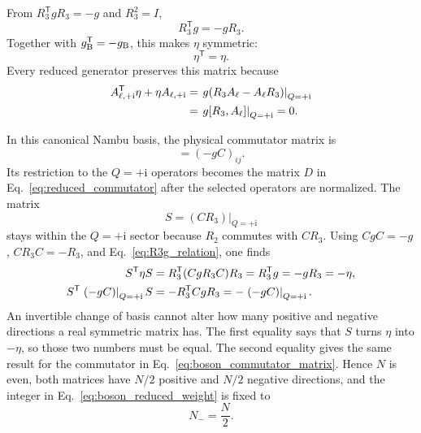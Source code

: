 \documentclass[onecolumn,aps,prb,amsmath,amssymb,superscriptaddress,longbibliography]{revtex4-2}
\newcommand{\ii}{\mathrm{i}}
\newcommand{\trans}{\mathsf{T}}
\begin{document}
From \(R_3^\trans gR_3=-g\) and \(R_3^2=I\),
\begin{equation}
    R_3^\trans g=-gR_3.
    \label{eq:R3g_relation}
\end{equation}
Together with \(g_{\rm B}^\trans=-g_{\rm B}\), this makes \(\eta\) symmetric:
\begin{equation}
    \eta^\trans=\eta.
    \label{eq:eta_symmetric}
\end{equation}
Every reduced generator preserves this matrix because
\begin{align}
    A_{\ell,+\ii}^\trans\eta+\eta A_{\ell,+\ii}
    &=\left.g(R_3A_\ell-A_\ell R_3)\right|_{Q=+\ii}
    \notag\\
    &=\left.g[R_3,A_\ell]\right|_{Q=+\ii}=0.
    \label{eq:eta_generator_relation}
\end{align}

In this canonical Nambu basis, the physical commutator matrix is
\begin{equation}
    [\hat\chi_i,\hat\chi_j^+]=(-gC)_{ij}.
    \label{eq:boson_commutator_matrix}
\end{equation}
Its restriction to the \(Q=+\ii\) operators becomes the matrix \(D\) in Eq.~\eqref{eq:reduced_commutator} after the selected operators are normalized.
The matrix
\begin{equation}
    S=(CR_3)\big|_{Q=+\ii}
    \label{eq:S_definition}
\end{equation}
stays within the \(Q=+\ii\) sector because \(R_2\) commutes with \(CR_3\).  Using \(CgC=-g\), \(CR_3C=-R_3\), and Eq.~\eqref{eq:R3g_relation}, one finds
\begin{align}
    S^\trans\eta S
    &=R_3^\trans(CgR_3C)R_3
      =R_3^\trans g=-gR_3=-\eta,
    \notag\\
    S^\trans\left.(-gC)\right|_{Q=+\ii}S
    &=-R_3^\trans CgR_3
      =-\left.(-gC)\right|_{Q=+\ii}.
    \label{eq:S_flips_forms}
\end{align}
An invertible change of basis cannot alter how many positive and negative directions a real symmetric matrix has.  The first equality says that \(S\) turns \(\eta\) into \(-\eta\), so those two numbers must be equal.  The second equality gives the same result for the commutator in Eq.~\eqref{eq:boson_commutator_matrix}.  Hence \(N\) is even, both matrices have \(N/2\) positive and \(N/2\) negative directions, and the integer in Eq.~\eqref{eq:boson_reduced_weight} is fixed to
\begin{equation}
    N_-=\frac N2.
    \label{eq:Nminus_half}
\end{equation}
\end{document}
